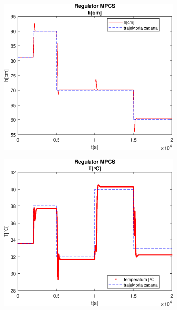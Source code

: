 \begin{figure}[h!]
   \centering
   \begin{subfigure}[b]{0.4\textwidth}
      \includegraphics[width=1\linewidth]{img/MPCSanaRK/MPCSRKHN500Nu60l40.eps}
      \caption{}
      \label{fig:fig:MPCSRKN500Nu60l401}
   \end{subfigure}
       
   \begin{subfigure}[b]{0.4\textwidth}
      \includegraphics[width=1\linewidth]{img/MPCSanaRK/MPCSRKTN500Nu60l40.eps}
      \caption{}
      \label{fig:fig:MPCSRKN500Nu60l402}
   \end{subfigure}
       

\end{figure}
